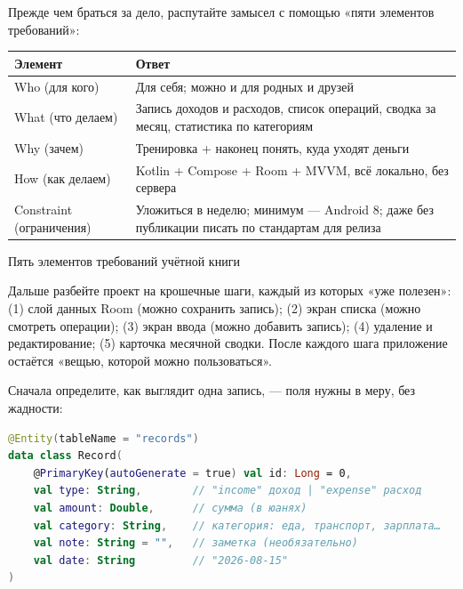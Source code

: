 


Прежде чем браться за дело, распутайте замысел с помощью «пяти элементов требований»:

\begin{center}
\begin{tabularx}{\linewidth}{|X|X|}
\hline
\textbf{Элемент} & \textbf{Ответ} \tabularnewline
\hline
Who (для кого) & Для себя; можно и для родных и друзей \tabularnewline
What (что делаем) & Запись доходов и расходов, список операций, сводка за месяц, статистика по категориям \tabularnewline
Why (зачем) & Тренировка + наконец понять, куда уходят деньги \tabularnewline
How (как делаем) & Kotlin + Compose + Room + MVVM, всё локально, без сервера \tabularnewline
Constraint (ограничения) & Уложиться в неделю; минимум — Android 8; даже без публикации писать по стандартам для релиза \tabularnewline
\hline
\end{tabularx}
\end{center}

\begin{center}\small\color{gray}Пять элементов требований учётной книги\end{center}

Дальше разбейте проект на крошечные шаги, каждый из которых «уже полезен»: (1) слой данных Room (можно сохранить запись); (2) экран списка (можно смотреть операции); (3) экран ввода (можно добавить запись); (4) удаление и редактирование; (5) карточка месячной сводки. После каждого шага приложение остаётся «вещью, которой можно пользоваться».


Сначала определите, как выглядит одна запись, — поля нужны в меру, без жадности:

\begin{lstlisting}[language=Kotlin]
@Entity(tableName = "records")
data class Record(
    @PrimaryKey(autoGenerate = true) val id: Long = 0,
    val type: String,        // "income" доход | "expense" расход
    val amount: Double,      // сумма (в юанях)
    val category: String,    // категория: еда, транспорт, зарплата…
    val note: String = "",   // заметка (необязательно)
    val date: String         // "2026-08-15"
)
\end{lstlisting}

